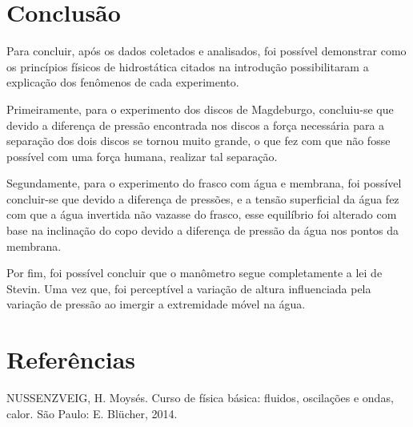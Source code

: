 \section{Conclusão}
Para concluir, após os dados coletados e analisados, foi possível  demonstrar
como os princípios físicos de hidrostática citados na introdução possibilitaram
a explicação dos fenômenos de cada experimento.

Primeiramente, para o experimento dos discos de Magdeburgo, concluiu-se que
devido a diferença de pressão encontrada nos discos a força necessária para a
separação dos dois discos se tornou muito grande, o que fez com que não fosse
possível com uma força humana, realizar tal separação.

Segundamente, para o experimento do frasco com água e membrana, foi possível
concluir-se que devido a diferença de pressões, e a tensão superficial da água
fez com que a água invertida não vazasse do frasco, esse equilíbrio foi alterado
com base na inclinação do copo devido a diferença de pressão da água nos pontos
da membrana.   

Por fim, foi possível concluir que o manômetro segue completamente a lei de
Stevin. Uma vez que, foi perceptível a variação de altura influenciada pela
variação de pressão ao imergir a extremidade móvel na água.

\newpage
\section{Referências}
NUSSENZVEIG, H. Moysés. Curso de física básica: fluidos, oscilações e ondas,
calor. São Paulo: E. Blücher, 2014.

